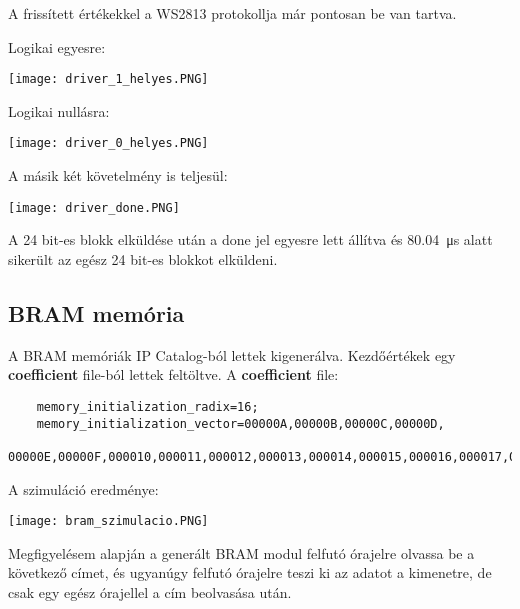 \tab A frissített értékekkel a WS2813 protokollja már pontosan be van tartva.

\tab Logikai egyesre:

\texttt{[image: driver\_1\_helyes.PNG]}

\tab Logikai nullásra:

\texttt{[image: driver\_0\_helyes.PNG]}

\tab A másik két követelmény is teljesül:

\texttt{[image: driver\_done.PNG]}

\tab A 24 bit-es blokk elküldése után a done jel egyesre lett állítva és \SI{80.04}{\micro\second} alatt sikerült az egész 24 bit-es blokkot elküldeni.


\subsection{BRAM memória}

\tab A BRAM memóriák IP Catalog-ból lettek kigenerálva\cite{vhdlguru2010bram}. Kezdőértékek egy \textbf{coefficient} file-ból lettek feltöltve\cite{vhdlguru2010bramcoe}.
A \textbf{coefficient} file:
\begin{verbatim}
	memory_initialization_radix=16;
	memory_initialization_vector=00000A,00000B,00000C,00000D,
		00000E,00000F,000010,000011,000012,000013,000014,000015,000016,000017,000018,000019;
\end{verbatim}

A szimuláció eredménye:

\texttt{[image: bram\_szimulacio.PNG]}

\tab Megfigyelésem alapján a generált BRAM modul felfutó órajelre olvassa be a következő címet, és ugyanúgy felfutó órajelre teszi ki az adatot a kimenetre, de csak egy egész órajellel a cím beolvasása után.
